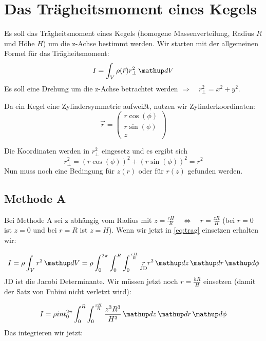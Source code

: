 \section{Das Trägheitsmoment eines Kegels}
Es soll das Trägheitsmoment eines Kegels (homogene Massenverteilung, Radius $R$ und Höhe $H$) um die z-Achse bestimmt werden.
Wir starten mit der allgemeinen Formel für das Trägheitsmoment:
\begin{equation}
\label{eq:trag}
I=\int_{V}\rho(\vec{r})r_{\perp}^2\dv{V}
\end{equation}
Es soll eine Drehung um die z-Achse betrachtet werden $\Rightarrow \quad r_{\perp}^2=x^2+y^2$.

Da ein Kegel eine Zylindersymmetrie aufweißt, nutzen wir Zylinderkoordinaten:
\begin{equation*}
\vec{r}=\begin{pmatrix} r\cos(\phi) \\ r\sin(\phi) \\ z \end{pmatrix}
\end{equation*}

Die Koordinaten werden in $r_{\perp}^2$ eingesetz und es ergibt sich
\begin{equation*}
r_{\perp}^2=\left(r\cos(\phi)\right)^2+\left(r\sin(\phi)\right)^2=r^2
\end{equation*}
Nun muss noch eine Bedingung für $z(r)$ oder für $r(z)$ gefunden werden.

\subsection{Methode A}
Bei Methode A sei z abhängig vom Radius mit $z=\frac{rH}{R} \quad \Leftrightarrow \quad r=\frac{zR}{H}$ (bei $r=0$ ist $z=0$ und bei $r=R$ ist $z=H$). Wenn wir jetzt in \eqref{eq:trag} einsetzen erhalten wir:

\begin{equation*}
I=\rho\int_{V} r^2 \dv{V}=\rho \int_{0}^{2\pi}\int_{0}^{R}\int_{0}^{\frac{rH}{R}} \underset{\text{JD}}{r}r^2\dv{z}\dv{r}\dv{\phi}
\end{equation*}
JD ist die Jacobi Determinante.
Wir müssen jetzt noch $ r=\frac{hR}{H}$ einsetzen (damit der Satz von Fubini nicht verletzt wird):

\begin{equation*}
I=\rho int_{0}^{2\pi}\int_{0}^{R}\int_{0}^{\frac{rH}{R}} \frac{z^3R^3}{H^3} \dv{z}\dv{r}\dv{\phi}
\end{equation*}
Das integrieren wir jetzt:

